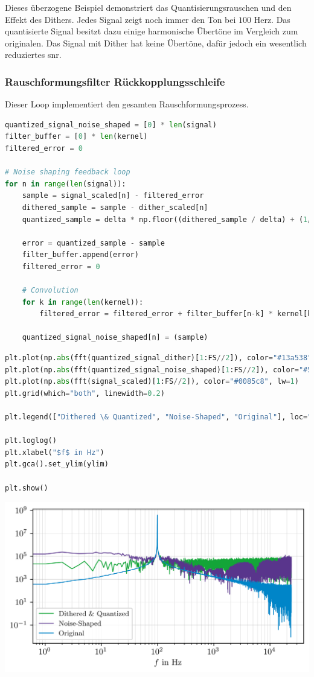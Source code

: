 Dieses überzogene Beispiel demonstriert das Quantisierungsrauschen und
den Effekt des Dithers. Jedes Signal zeigt noch immer den Ton bei
\(100\) Herz. Das quantisierte Signal besitzt dazu einige harmonische
Übertöne im Vergleich zum originalen. Das Signal mit Dither hat keine
Übertöne, dafür jedoch ein wesentlich reduziertes \gls{snr}.

\hypertarget{rauschformungsfilter-ruxfcckkopplungsschleife}{%
\subsubsection{Rauschformungsfilter
Rückkopplungsschleife}\label{rauschformungsfilter-ruxfcckkopplungsschleife}}

Dieser Loop implementiert den gesamten Rauschformungsprozess.

\begin{lstlisting}[language=Python]
quantized_signal_noise_shaped = [0] * len(signal)
filter_buffer = [0] * len(kernel)
filtered_error = 0

# Noise shaping feedback loop
for n in range(len(signal)):
    sample = signal_scaled[n] - filtered_error
    dithered_sample = sample - dither_scaled[n]
    quantized_sample = delta * np.floor((dithered_sample / delta) + (1/2))

    error = quantized_sample - sample
    filter_buffer.append(error)
    filtered_error = 0

    # Convolution
    for k in range(len(kernel)):
        filtered_error = filtered_error + filter_buffer[n-k] * kernel[k]

    quantized_signal_noise_shaped[n] = (sample)
\end{lstlisting}

\begin{lstlisting}[language=Python]
plt.plot(np.abs(fft(quantized_signal_dither)[1:FS//2]), color="#13a538", lw=1)
plt.plot(np.abs(fft(quantized_signal_noise_shaped)[1:FS//2]), color="#59358c", lw=1)
plt.plot(np.abs(fft(signal_scaled)[1:FS//2]), color="#0085c8", lw=1)
plt.grid(which="both", linewidth=0.2)

plt.legend(["Dithered \& Quantized", "Noise-Shaped", "Original"], loc="lower left", fontsize="small")

plt.loglog()
plt.xlabel("$f$ in Hz")
plt.gca().set_ylim(ylim)

plt.show()
\end{lstlisting}

\includegraphics{./img/8b39079d506951c45dafa9c94a1343cd68731ddc.png}

